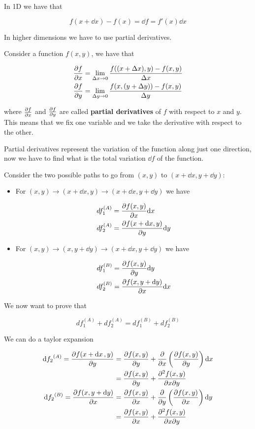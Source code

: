 \documentclass[10pt]{extarticle}
\begin{document}
In 1D we have that

$$
  f(x + \dd{x}) - f(x) = \dd{f} = f'(x) \dd{x}
$$

In higher dimensions we have to use partial derivatives.

Consider a function $f(x, y)$, we have that

\begin{align*}
  \pdv{f}{x} & = \lim_{\Delta x \to 0} \frac{f((x + \Delta x), y) - f(x, y)}{\Delta x} \\
  \pdv{f}{y} & = \lim_{\Delta y \to 0} \frac{f(x, (y + \Delta y)) - f(x, y)}{\Delta y}
\end{align*}

where $\pdv{f}{x}$ and $\pdv{f}{y}$ are called \textbf{partial derivatives} of $f$ with respect to $x$ and $y$.
This means that we fix one variable and we take the derivative with respect to the other.

Partial derivatives represent the variation of the function along just one direction, now we have to find what is the total variation $\dd{f}$ of the function.

Consider the two possible paths to go from $(x, y)$ to $(x + \dd{x}, y + \dd{y})$:

\begin{itemize}
  \item For $(x, y) \to (x + \dd{x}, y) \to (x + \dd{x}, y + \dd{y})$ we have

        \begin{align*}
          df_1^{(A)} & = \pdv{f(x,y)}{x} \dd x          \\
          df_2^{(A)} & = \pdv{f(x + \dd x, y)}{y} \dd y
        \end{align*}

  \item For $(x, y) \to (x, y + \dd{y}) \to (x + \dd{x}, y + \dd{y})$ we have

        \begin{align*}
          df_1^{(B)} & = \pdv{f(x,y)}{y} \dd y          \\
          df_2^{(B)} & = \pdv{f(x, y + \dd y)}{x} \dd x
        \end{align*}
\end{itemize}

We now want to prove that

$$
  df_1^{(A)} + df_2^{(A)} = df_1^{(B)} + df_2^{(B)}
$$

We can do a taylor expansion

\begin{align*}
  \dd{f_2}^{(A)} = \pdv{f(x + \dd{x}, y)}{y} & = \pdv{f(x, y)}{y} + \pdv{x} \left( \pdv{f(x, y)}{y} \right) \dd{x} \\
                                             & = \pdv{f(x, y)}{y} + \pdv{f(x, y)}{x}{y}                            \\
  \dd{f_2}^{(B)} = \pdv{f(x, y + \dd{y})}{x} & = \pdv{f(x, y)}{x} + \pdv{y} \left( \pdv{f(x, y)}{x} \right) \dd{y} \\
                                             & = \pdv{f(x, y)}{x} + \pdv{f(x, y)}{x}{y}
\end{align*}
\end{document}
